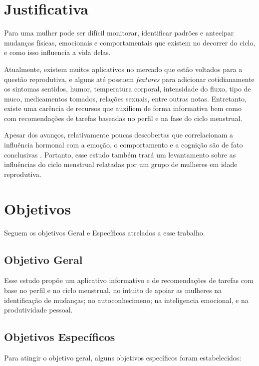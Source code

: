 \section{Justificativa}

Para uma mulher pode ser difícil monitorar, identificar padrões e antecipar mudanças físicas, 
emocionais e comportamentais que existem no decorrer do ciclo, e como isso influencia a vida delas.

Atualmente, existem muitos aplicativos no mercado que estão voltados para a questão reprodutiva, 
e alguns até possuem \textit{features} para adicionar cotidianamente os sintomas sentidos, humor, 
temperatura corporal, intensidade do fluxo, tipo de muco, medicamentos tomados, relações sexuais, 
entre outras notas. Entretanto, existe uma carência de recursos que auxiliem de forma informativa bem 
como com recomendações de tarefas baseadas no perfil e na fase do ciclo menstrual.

Apesar dos avanços, relativamente poucas descobertas que correlacionam a influência hormonal com a 
emoção, o comportamento e a cognição são de fato conclusivas \cite{poroma2014}. Portanto, esse estudo 
também trará um levantamento sobre as influências do ciclo menstrual relatadas por um grupo de mulheres 
em idade reprodutiva.


\section{Objetivos}

Seguem os objetivos Geral e Específicos atrelados a esse trabalho.

\subsection{Objetivo Geral}


Esse estudo propõe um aplicativo informativo e de recomendações de tarefas com base no perfil e no ciclo 
menstrual, no intuito de apoiar as mulheres na identificação de mudanças; no autoconhecimeno; na inteligencia emocional, e na produtividade pessoal.


\subsection{Objetivos Específicos}

Para atingir o objetivo geral, alguns objetivos específicos foram estabelecidos:

